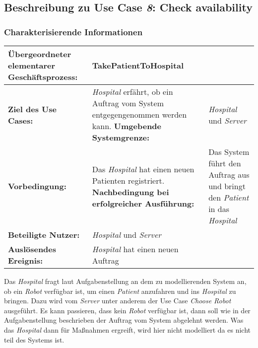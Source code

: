 		\subsection{Beschreibung zu Use Case \emph{8}: Check availability}

			\subsubsection*{Charakterisierende Informationen}

			\begin{table}[H]
				\centering
				\begin{tabularx}{\textwidth}{@{}p{5cm}X@{}}
				\hline
				\textbf{Übergeordneter elementarer Geschäftsprozess:} & TakePatientToHospital  \\ \hline
				\textbf{Ziel des Use Cases:} & \emph{Hospital} erfährt, ob ein Auftrag vom System entgegengenommen werden kann. \hline
				\textbf{Umgebende Systemgrenze:} & \emph{Hospital} und \emph{Server} \\ \hline
				\textbf{Vorbedingung:} & Das \emph{Hospital} hat einen neuen Patienten registriert. \hline
				\textbf{Nachbedingung bei erfolgreicher Ausführung:} & Das System führt den Auftrag aus und bringt den \emph{Patient} in das \emph{Hospital} \\ \hline
				\textbf{Beteiligte Nutzer:} & \emph{Hospital} und \emph{Server}\\ \hline
				\textbf{Auslösendes Ereignis:} & \emph{Hospital} hat einen neuen Auftrag\\
				\hline
				\end{tabularx}
			\end{table}

			Das \emph{Hospital} fragt laut Aufgabenstellung an dem zu modellierenden System an, ob ein \emph{Robot} verfügbar ist, um einen \emph{Patient} anzufahren und ins \emph{Hospital} zu bringen. Dazu wird vom \emph{Server} unter anderem der Use Case \emph{Choose Robot} ausgeführt. Es kann passieren, dass kein \emph{Robot} verfügbar ist, dann soll wie in der Aufgabenstellung beschrieben der Auftrag vom System abgelehnt werden. Was das \emph{Hospital} dann für Maßnahmen ergreift, wird hier nicht modelliert da es nicht teil des Systems ist.


